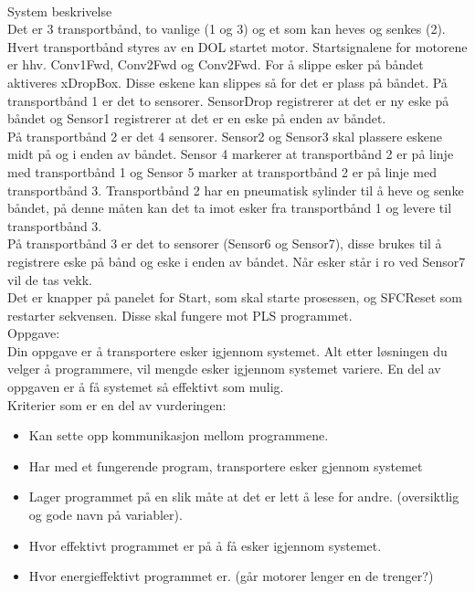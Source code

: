 

\\[0.3cm]
System beskrivelse\\[0.3cm]

Det er 3 transportbånd, to vanlige (1 og 3) og et som kan heves og senkes (2). Hvert transportbånd styres av en DOL startet motor. Startsignalene for motorene er hhv. Conv1Fwd, Conv2Fwd og Conv2Fwd. For å slippe esker på båndet aktiveres xDropBox. Disse eskene kan slippes så for det er plass på båndet. 
På transportbånd 1 er det to sensorer. SensorDrop registrerer at det er ny eske på båndet og Sensor1 registrerer at det er en eske på enden av båndet.\\[0.3cm]
 
På transportbånd 2 er det 4 sensorer. Sensor2 og Sensor3 skal plassere eskene midt på og i enden av båndet. Sensor 4 markerer at transportbånd 2 er på linje med transportbånd 1 og Sensor 5 marker at transportbånd 2 er på linje med transportbånd 3. Transportbånd 2 har en pneumatisk sylinder til å heve og senke båndet, på denne måten kan det ta imot esker fra transportbånd 1 og levere til transportbånd 3.\\[0.3cm]
  
På transportbånd 3 er det to sensorer (Sensor6 og Sensor7), disse brukes til å registrere eske på bånd og eske i enden av båndet. Når esker står i ro ved Sensor7 vil de tas vekk. \\[0.3cm]

Det er knapper på panelet for Start, som skal starte prosessen, og SFCReset som restarter sekvensen. Disse skal fungere mot PLS programmet. \\[0.3cm]

Oppgave:\\
Din oppgave er å transportere esker igjennom systemet. Alt etter løsningen du velger å programmere, vil mengde esker igjennom systemet variere. En del av oppgaven er å få systemet så effektivt som mulig. \\[0.3cm]
Kriterier som er en del av vurderingen:
\begin{itemize}[noitemsep]
	\item Kan sette opp kommunikasjon mellom programmene. 
	\item Har med et fungerende program, transportere esker gjennom systemet
	\item Lager programmet på en slik måte at det er lett å lese for andre. (oversiktlig og gode navn på variabler). 
	\item Hvor effektivt programmet er på å få esker igjennom systemet. 
	\item Hvor energieffektivt programmet er. (går motorer lenger en de trenger?)
\end{itemize}

